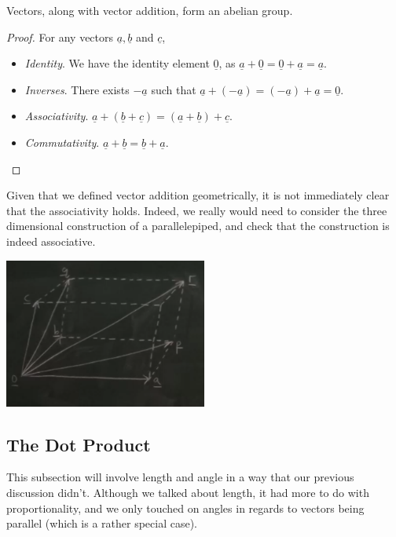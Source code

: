 \documentclass[a4]{scrartcl}
\begin{document}
\begin{theorem}
	Vectors, along with vector addition, form an abelian group.
\end{theorem}
\begin{proof}
	For any vectors $\underline{a}, \underline{b}$ and $\underline{c}$,\phantom{\qedhere}
	\begin{itemize}
		\item \emph{Identity}. We have the identity element $\underline{0}$, as $\underline{a} + \underline{0} = \underline{0} + \underline{a} = \underline{a}$.
		\item \emph{Inverses}. There exists $-\underline{a}$ such that $\underline{a} + (-\underline{a})= (-\underline{a}) + \underline{a} = \underline{0}$.
		\item \emph{Associativity}. $\underline{a} + (\underline{b} + \underline{c}) = (\underline{a} + \underline{b}) + \underline{c}$.
		\item \emph{Commutativity}. $\underline{a} + \underline{b} = \underline{b} + \underline{a}$. \hfill \qedsymbol
	\end{itemize}
\end{proof}

\begin{remark}
	Given that we defined vector addition geometrically, it is not immediately clear that the associativity holds. Indeed, we really would need to consider the three dimensional construction of a parallelepiped, and check that the construction is indeed associative.
	\begin{center}
		\includegraphics[width=0.5\textwidth]{parallelapiped.png}
	\end{center}
\end{remark}

\subsection{The Dot Product}

This subsection will involve length and angle in a way that our previous discussion didn't. Although we talked about length, it had more to do with proportionality, and we only touched on angles in regards to vectors being parallel (which is a rather special case).
\end{document}
